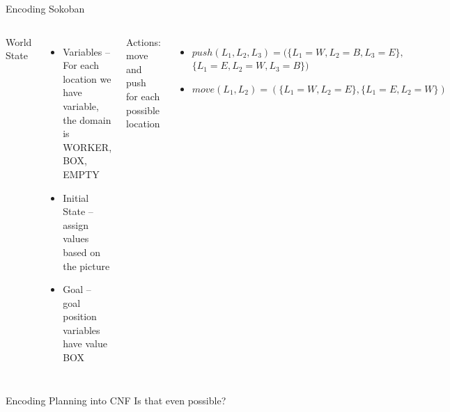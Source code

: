 \documentclass[t]{sdqbeamer}
\begin{document}
\begin{frame}{Encoding Sokoban}
\begin{columns}[onlytextwidth,T]
World State
\begin{itemize}
	\item Variables -- 
	For each location we have variable, the domain is WORKER, BOX, EMPTY
	\item Initial State -- assign values based on the picture
	\item Goal -- goal position variables have value BOX
\end{itemize}

Actions: move and push for each possible location
 
\begin{itemize}
	\item $push(L_1,L_2,L_3)=(\{L_1=W, L_2=B, L_3=E\},$\\
	 \hspace{9em}$\{L_1=E, L_2=W, L_3=B\})$
	\item $move(L_1,L_2)=(\{L_1=W, L_2=E\},\{L_1=E,L_2=W\})$
\end{itemize}
\includegraphics[scale=0.45]{figures/l10/sokoban.png}
\end{columns}
\end{frame}


\begin{frame}{Encoding Planning into CNF}
Is that even possible?
\end{frame}
\end{document}
